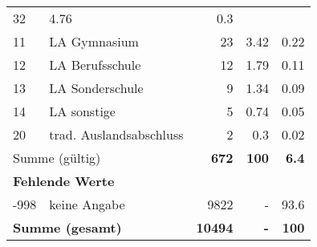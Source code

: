 \begin{longtable}{lXrrr}
       \num{32} &
       \num[round-mode=places,round-precision=2]{4,76} &
         \num[round-mode=places,round-precision=2]{0,3} \\

     11 &
     \multicolumn{1}{X}{ LA Gymnasium   } &


       \num{23} &
       \num[round-mode=places,round-precision=2]{3,42} &
         \num[round-mode=places,round-precision=2]{0,22} \\

     12 &
     \multicolumn{1}{X}{ LA Berufsschule   } &


       \num{12} &
       \num[round-mode=places,round-precision=2]{1,79} &
         \num[round-mode=places,round-precision=2]{0,11} \\

     13 &
     \multicolumn{1}{X}{ LA Sonderschule   } &


       \num{9} &
       \num[round-mode=places,round-precision=2]{1,34} &
         \num[round-mode=places,round-precision=2]{0,09} \\

     14 &
     \multicolumn{1}{X}{ LA sonstige   } &


       \num{5} &
       \num[round-mode=places,round-precision=2]{0,74} &
         \num[round-mode=places,round-precision=2]{0,05} \\

     20 &
     \multicolumn{1}{X}{ trad. Auslandsabschluss   } &


       \num{2} &
       \num[round-mode=places,round-precision=2]{0,3} &
         \num[round-mode=places,round-precision=2]{0,02} \\
     \midrule
     \multicolumn{2}{l}{Summe (gültig)} &
       \textbf{\num{672}} &
     \textbf{100} &
       \textbf{\num[round-mode=places,round-precision=2]{6,4}} \\
     \multicolumn{5}{l}{\textbf{Fehlende Werte}}\\
       -998 &
       keine Angabe &
         \num{9822} &
        - &
         \num[round-mode=places,round-precision=2]{93,6} \\
     \midrule
     \multicolumn{2}{l}{\textbf{Summe (gesamt)}} &
          \textbf{\num{10494}} &
        \textbf{-} &
        \textbf{100} \\
     \bottomrule
     \end{longtable}
     
